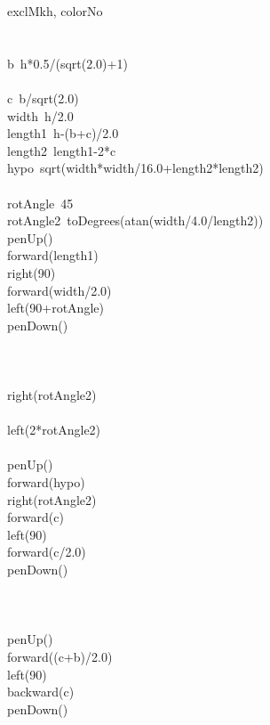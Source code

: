 \documentclass[a4paper,10pt]{article}
\begin{document}
\begin{pseudocode}{exclMk}{h, colorNo }
\label{exclMk}
\\
\\
  \\
  b\gets\ h*0.5/(sqrt(2.0)+1)\\
  \\
  c\gets\ b/sqrt(2.0)\\
  width\gets\ h/2.0\\
  length1\gets\ h-(b+c)/2.0\\
  length2\gets\ length1-2*c\\
  hypo\gets\ sqrt(width*width/16.0+length2*length2)\\
  \\
  rotAngle\gets\ 45\\
  rotAngle2\gets\ toDegrees(atan(width/4.0/length2))\\
  penUp()\\
  forward(length1)\\
  right(90)\\
  forward(width/2.0)\\
  left(90+rotAngle)\\
  penDown()\\
  \\
  \\
  \\
  right(rotAngle2)\\
  \\
  left(2*rotAngle2)\\
  \\
  penUp()\\
  forward(hypo)\\
  right(rotAngle2)\\
  forward(c)\\
  left(90)\\
  forward(c/2.0)\\
  penDown()\\
  \\
  \\
  \\
  penUp()\\
  forward((c+b)/2.0)\\
  left(90)\\
  backward(c)\\
  penDown()\\
\ENDPROCEDURE
\end{pseudocode}
\end{document}
